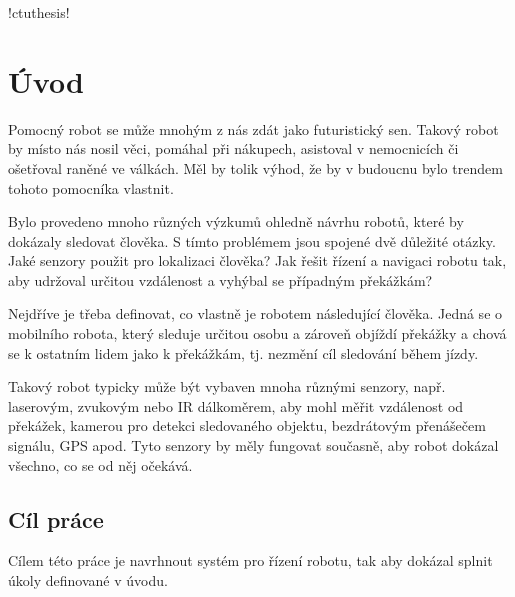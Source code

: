 \documentclass[twoside]{ctuthesis}
\theoremstyle{plain}
\theoremstyle{definition}
\theoremstyle{note}
\begin{document}
\renewcommand \ctulstsep {0pt}

\newcommand\ctuclsname{\leavevmode\unhcopy\ctuclsnamebox}
\newsavebox\ctuclsnamebox
\begin{lrbox}{\ctuclsnamebox}
\ctulst!ctuthesis!
\end{lrbox}

\maketitle

\chapter{Úvod}

Pomocný robot se může mnohým z nás  zdát jako futuristický sen. Takový robot by místo nás nosil věci, pomáhal při nákupech, asistoval v nemocnicích či ošetřoval raněné ve válkách.  Měl by tolik výhod, že by v budoucnu bylo trendem tohoto pomocníka vlastnit.

Bylo provedeno mnoho různých výzkumů ohledně návrhu robotů, které by dokázaly sledovat člověka. S tímto problémem jsou spojené dvě důležité otázky. Jaké senzory použit pro lokalizaci člověka? Jak řešit řízení a navigaci robotu tak, aby udržoval určitou vzdálenost a vyhýbal se případným překážkám?

Nejdříve je třeba definovat, co vlastně je robotem následující člověka. Jedná se o mobilního robota, který sleduje určitou osobu
a zároveň objíždí překážky a chová se k ostatním lidem jako k překážkám, tj. nezmění cíl sledování během jízdy.

Takový robot typicky může být vybaven mnoha různými senzory, např. laserovým, zvukovým nebo IR dálkoměrem, aby mohl měřit vzdálenost od překážek, kamerou pro detekci sledovaného objektu, bezdrátovým přenášečem signálu, GPS apod. Tyto senzory by měly fungovat současně, aby robot dokázal všechno, co se od něj očekává.

\section{Cíl práce}
Cílem této práce je navrhnout systém pro řízení robotu, tak aby dokázal splnit úkoly definované v úvodu. 
\end{document}

